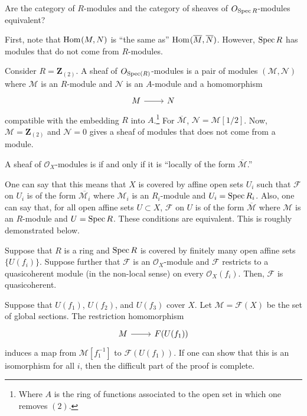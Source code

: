 \documentclass [11 pt, oneside] {article}
\begin{document}
\begin{problem}
	Are the category of $R$-modules and the category of sheaves of $\relax{O}_{\operatorname{Spec} R}$-modules equivalent?
\end{problem}

First, note that $\operatorname{Hom}_{}(\relax{M}, \relax{N})$ is ``the same as'' $\operatorname{Hom}_{}(\overline{\relax{M}}, \overline{\relax{N}})$. However, $\operatorname{Spec} R$ has modules that do not come from $R$-modules.

\begin{example}[ ]\label{}\text{}
Consider $R=\mathbf{Z}_{(2)}$. A sheaf of $\relax{O}_{\operatorname{Spec}(R)}$-modules is a pair of modules $(\mathscr{M},\mathscr{N})$ where $\mathscr{M}$ is an $R$-module and $\mathscr{N}$ is an $A$-module and a homomorphism 
\[
\begin{tikzcd}
\mathscr{M}\ar[r]&\mathscr{N}
\end{tikzcd}
\] 
 compatible with the embedding $R$ into $A$.\footnote{Where $A$ is the ring of functions associated to the open set in which one removes $(2)$.} For $\overline{\mathscr{M}}$, $\mathscr{N} = \mathscr{M}[1/2]$. Now, $\mathscr{M}=\mathbf{Z}_{(2)}$ and $\mathscr{N}=0$ gives a sheaf of modules that does not come from a module.
\end{example}

\begin{definition}[ ]\label{}\text{}
A sheaf of $\mathscr{O}_X$-modules is  if and only if it is ``locally of the form $\overline{\mathscr{M}}$.''
\end{definition}

One can say that this means that $X$ is covered by affine open sets $U_i$ such that $\mathscr{F}$ on $U_i$ is of the form $\overline{\mathscr{M}_i}$ where $\mathscr{M}_i$ is an $R_i$-module and $U_i=\operatorname{Spec} R_i$. Also, one can say that, for all open affine sets $U\subset X$, $\mathscr{F}$ on $U$ is of the form $\overline{\mathscr{M}}$ where $\mathscr{M}$ is an $R$-module and $U=\operatorname{Spec} R$. These conditions are equivalent. This is roughly demonstrated below.

Suppose that $R$ is a ring and $\operatorname{Spec} R$ is covered by finitely many open affine sets $\{U(f_i)\}$. Suppose further that $\mathscr{F}$ is an $\mathscr{O}_X$-module and $\mathscr{F}$ restricts to a quasicoherent module (in the non-local sense) on every $\mathscr{O}_X(f_i)$. Then, $\mathscr{F}$ is quasicoherent.

Suppose that $U(f_1)$, $U(f_2)$, and $U(f_3)$ cover $X$. Let $\mathscr{M}=\mathscr{F}(X)$ be the set of global sections. The restriction homomorphism 
\[
\begin{tikzcd}
\mathscr{M}\ar[r]&\mathscr{F}(U(f_1))
\end{tikzcd}
\]  
induces a map from $\mathscr{M}[f_1^{-1}]$ to $\mathscr{F}(U(f_1))$. If one can show that this is an isomorphism for all $i$, then the difficult part of the proof is complete.
\end{document}
